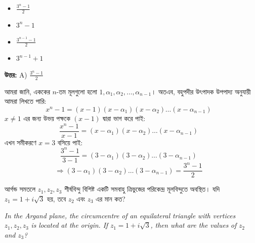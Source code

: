 \documentclass[12pt, a4paper]{article}
\begin{document}
\begin{itemize}[label={}, leftmargin=1cm, itemsep=0.5em]
    \item[\textbf{A)}] $\frac{3^n - 1}{2}$
    \item[\textbf{B)}] $3^n - 1$
    \item[\textbf{C)}] $\frac{3^{n-1} - 1}{2}$
    \item[\textbf{D)}] $3^{n-1} + 1$
\end{itemize}

\vspace{0.5em}
\begin{tcolorbox}[answerbox]
    \textbf{\color{success} উত্তর:} A) $\frac{3^n - 1}{2}$
\end{tcolorbox}
\vspace{1em}

\begin{tcolorbox}[solutionbox={সমাধান (Solution)}]
    \noindent
    আমরা জানি, এককের $n$-তম মূলগুলো হলো $1, \alpha_1, \alpha_2, \dots, \alpha_{n-1}$। অতএব, বহুপদীর উৎপাদক উপপাদ্য অনুযায়ী আমরা লিখতে পারি:
    \[ x^n - 1 = (x - 1)(x - \alpha_1)(x - \alpha_2)\dots(x - \alpha_{n-1}) \]
    $x \neq 1$ এর জন্য উভয় পক্ষকে $(x - 1)$ দ্বারা ভাগ করে পাই:
    \[ \frac{x^n - 1}{x - 1} = (x - \alpha_1)(x - \alpha_2)\dots(x - \alpha_{n-1}) \]
    এখন সমীকরণে $x = 3$ বসিয়ে পাই:
    \[ \frac{3^n - 1}{3 - 1} = (3 - \alpha_1)(3 - \alpha_2)\dots(3 - \alpha_{n-1}) \]
    \[ \Rightarrow (3 - \alpha_1)(3 - \alpha_2)\dots(3 - \alpha_{n-1}) = \frac{3^n - 1}{2} \]
\end{tcolorbox}
\vspace{1em}

\begin{tcolorbox}[questionbox={প্রশ্ন (Question) 16}]
    \noindent
    আর্গন্ড সমতলে $z_1, z_2, z_3$ শীর্ষবিন্দু বিশিষ্ট একটি সমবাহু ত্রিভুজের পরিকেন্দ্র মূলবিন্দুতে অবস্থিত। যদি $z_1 = 1 + i\sqrt{3}$ হয়, তবে $z_2$ এবং $z_3$ এর মান কত?
    
    \vspace{0.8em}
    \begin{english}
    \noindent\textit{\color{darkgray}
    In the Argand plane, the circumcentre of an equilateral triangle with vertices $z_1, z_2, z_3$ is located at the origin. If $z_1 = 1 + i\sqrt{3}$, then what are the values of $z_2$ and $z_3$?
    }
    \end{english}
\end{tcolorbox}
\end{document}
